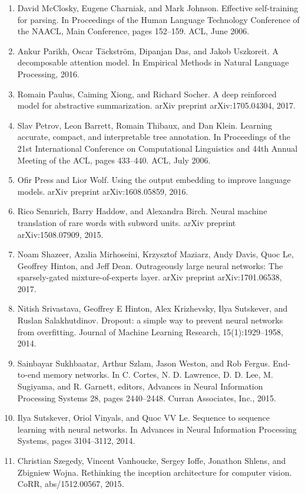 \documentclass[11pt,UTF8,fontset=fandol]{ctexart}
\begin{document}
\begin{enumerate}[leftmargin=2.4em,labelsep=0.6em,itemsep=0.15em]
\item David McClosky, Eugene Charniak, and Mark Johnson. Effective self-training for parsing. In Proceedings of the Human Language Technology Conference of the NAACL, Main Conference, pages 152--159. ACL, June 2006.
\item Ankur Parikh, Oscar T\"ackstr\"om, Dipanjan Das, and Jakob Uszkoreit. A decomposable attention model. In Empirical Methods in Natural Language Processing, 2016.
\item Romain Paulus, Caiming Xiong, and Richard Socher. A deep reinforced model for abstractive summarization. arXiv preprint arXiv:1705.04304, 2017.
\item Slav Petrov, Leon Barrett, Romain Thibaux, and Dan Klein. Learning accurate, compact, and interpretable tree annotation. In Proceedings of the 21st International Conference on Computational Linguistics and 44th Annual Meeting of the ACL, pages 433--440. ACL, July 2006.
\item Ofir Press and Lior Wolf. Using the output embedding to improve language models. arXiv preprint arXiv:1608.05859, 2016.
\item Rico Sennrich, Barry Haddow, and Alexandra Birch. Neural machine translation of rare words with subword units. arXiv preprint arXiv:1508.07909, 2015.
\item Noam Shazeer, Azalia Mirhoseini, Krzysztof Maziarz, Andy Davis, Quoc Le, Geoffrey Hinton, and Jeff Dean. Outrageously large neural networks: The sparsely-gated mixture-of-experts layer. arXiv preprint arXiv:1701.06538, 2017.
\item Nitish Srivastava, Geoffrey E Hinton, Alex Krizhevsky, Ilya Sutskever, and Ruslan Salakhutdinov. Dropout: a simple way to prevent neural networks from overfitting. Journal of Machine Learning Research, 15(1):1929--1958, 2014.
\item Sainbayar Sukhbaatar, Arthur Szlam, Jason Weston, and Rob Fergus. End-to-end memory networks. In C. Cortes, N. D. Lawrence, D. D. Lee, M. Sugiyama, and R. Garnett, editors, Advances in Neural Information Processing Systems 28, pages 2440--2448. Curran Associates, Inc., 2015.
\item Ilya Sutskever, Oriol Vinyals, and Quoc VV Le. Sequence to sequence learning with neural networks. In Advances in Neural Information Processing Systems, pages 3104--3112, 2014.
\item Christian Szegedy, Vincent Vanhoucke, Sergey Ioffe, Jonathon Shlens, and Zbigniew Wojna. Rethinking the inception architecture for computer vision. CoRR, abs/1512.00567, 2015.

\end{enumerate}
\end{document}
